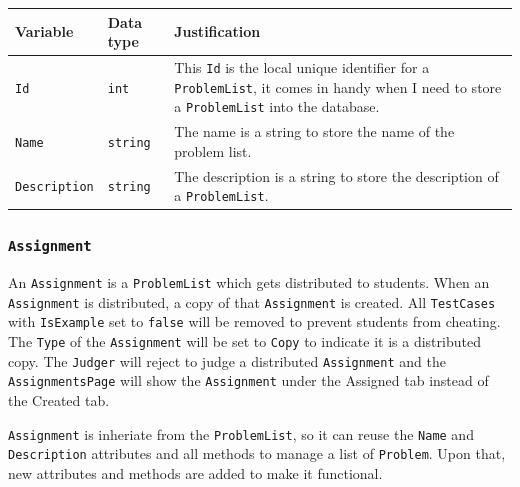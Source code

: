 \documentclass[a4paper]{report}
\begin{document}
\begin{tabulary}{\textwidth}{|l|l|L|}
    \hline
    Variable & Data type & Justification \\
    \hline
    \texttt{Id} & \texttt{int} & This \texttt{Id} is the local unique identifier for a \texttt{ProblemList}, it comes in handy when I need to store a \texttt{ProblemList} into the database. \\
    \hline
    \texttt{Name} & \texttt{string} & The name is a string to store the name of the problem list. \\
    \hline
    \texttt{Description} & \texttt{string} & The description is a string to store the description of a \texttt{ProblemList}. \\
    \hline
\end{tabulary}

\subsubsection{\texttt{Assignment}}

An \texttt{Assignment} is a \texttt{ProblemList} which gets distributed to students. When an \texttt{Assignment} is distributed, a copy of that \texttt{Assignment} is created. All \texttt{TestCases} with \texttt{IsExample} set to \texttt{false} will be removed to prevent students from cheating. The \texttt{Type} of the \texttt{Assignment} will be set to \texttt{Copy} to indicate it is a distributed copy. The \texttt{Judger} will reject to judge a distributed \texttt{Assignment} and the \texttt{AssignmentsPage} will show the \texttt{Assignment} under the Assigned tab instead of the Created tab.

\texttt{Assignment} is inheriate from the \texttt{ProblemList}, so it can reuse the \texttt{Name} and \texttt{Description} attributes and all methods to manage a list of \texttt{Problem}. Upon that, new attributes and methods are added to make it functional.
\end{document}
